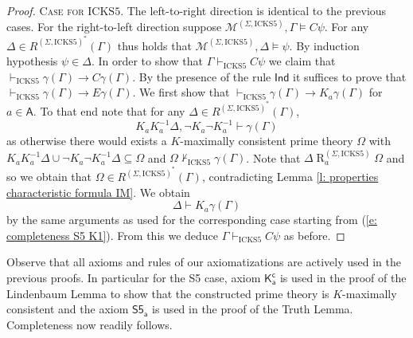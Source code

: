 \documentclass{myifcolog}
\newcommand\C {C}
\newcommand{\K}{K}
\newcommand\A{\mathsf{A}}
\newcommand{\agi}{a}
\newcommand{\E}{E}
\newcommand{\fw}{\mathcal{M}}
\newcommand{\Rel}{\mathrel{R}}
\newcommand{\hickss}{\mathrm{ICKS5}}
\numberwithin{theorem}{section}
\begin{document}
\begin{proof}
 \noindent \textsc{Case for $\hickss$.} The left-to-right direction is identical to the previous cases. For the right-to-left direction suppose $\fw^{(\Sigma, \hickss)}, \Gamma \models \C \psi$. For any $\Delta \in R^{(\Sigma, \hickss)^*}(\Gamma)$ thus holds that $\fw^{(\Sigma, \hickss)}, \Delta \models \psi$. By induction hypothesis $\psi \in \Delta$. In order to show that $\Gamma \vdash_\hickss \C \psi$ we claim that $\vdash_\hickss \gamma(\Gamma) \rightarrow \C \gamma(\Gamma)$. By the presence of the rule $\mathsf{Ind}$ it suffices to prove that $\vdash_\hickss \gamma(\Gamma) \rightarrow \E \gamma(\Gamma)$. We first show that $\vdash_\hickss \gamma(\Gamma) \rightarrow \K_\agi \gamma(\Gamma)$ for $\agi \in \A$. To that end note that for any $\Delta \in R^{(\Sigma, \hickss)^*}(\Gamma)$,
 \begin{equation*}
     \K_\agi \K_\agi^{-1} \Delta, \neg \K_\agi \neg \K_\agi^{-1} \vdash \gamma(\Gamma)
 \end{equation*}
 as otherwise there would exists a $\K$-maximally consistent prime theory $\Omega$ with $\K_\agi \K_\agi^{-1} \Delta \cup \neg \K_\agi \neg \K_\agi^{-1} \Delta \subseteq \Omega$ and $\Omega \not \vdash_\hickss \gamma(\Gamma)$. Note that $\Delta \Rel_\agi^{(\Sigma, \hickss)} \Omega$ and so we obtain that $\Omega \in R^{(\Sigma, \hickss)^*}(\Gamma)$, contradicting Lemma \ref{l: properties characteristic formula IM}. We obtain
 \begin{equation*}
     \Delta \vdash \K_\agi \gamma(\Gamma)
 \end{equation*}
 by the same arguments as used for the corresponding case starting from (\ref{e: completeness S5 K1}). From this we deduce $\Gamma \vdash_\hickss \C \psi$ as before.
\end{proof}



Observe that all axioms and rules of our axiomatizations are actively used in the previous proofs. In particular for the S5 case, axiom $\mathsf{K_\agi^c}$ is used in the proof of the Lindenbaum Lemma to show that the constructed prime theory is $K$-maximally consistent and the axiom $\mathsf{S5_\agi}$ is used in the proof of the Truth Lemma. Completeness now readily follows.
\end{document}
